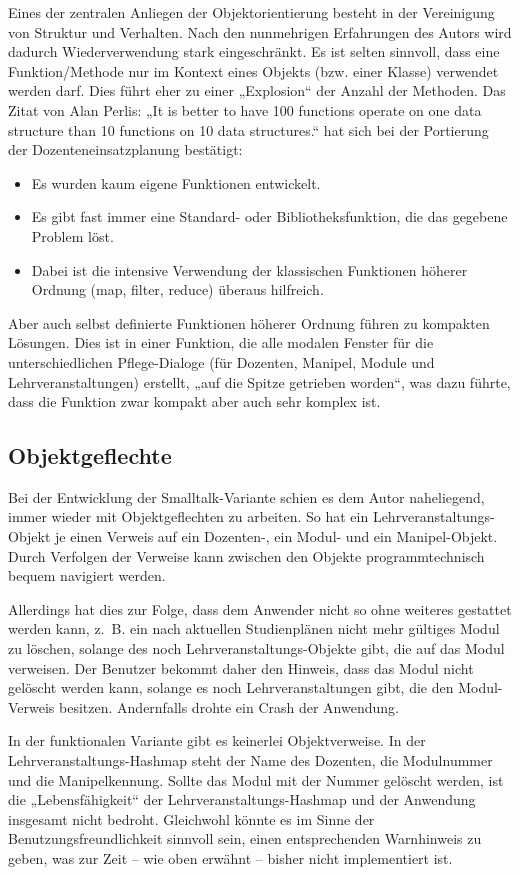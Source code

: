 \documentclass[11pt]{article}
\begin{document}
Eines der zentralen Anliegen der Objektorientierung besteht in der
Vereinigung von Struktur und Verhalten. Nach den nunmehrigen
Erfahrungen des Autors wird dadurch Wiederverwendung stark
eingeschränkt. Es ist selten sinnvoll, dass eine Funktion/Methode nur
im Kontext eines Objekts (bzw. einer Klasse) verwendet werden
darf. Dies führt eher zu einer „Explosion“ der Anzahl der
Methoden. Das Zitat von Alan Perlis: „It is better to have 100
functions operate on one data structure than 10 functions on 10 data
structures.“ hat sich bei der Portierung der Dozenteneinsatzplanung bestätigt:
\begin{itemize}
\item Es wurden kaum eigene Funktionen entwickelt.
\item Es gibt fast immer eine Standard- oder Bibliotheksfunktion, die das
gegebene Problem löst.
\item Dabei ist die intensive Verwendung der klassischen Funktionen
höherer Ordnung (map, filter, reduce) überaus hilfreich.
\end{itemize}
Aber auch selbst definierte Funktionen höherer Ordnung führen zu kompakten
Lösungen. Dies ist in einer Funktion, die alle modalen Fenster für die
unterschiedlichen Pflege-Dialoge (für Dozenten, Manipel, Module und
Lehrveranstaltungen) erstellt, „auf die Spitze getrieben worden“, was
dazu führte, dass die Funktion zwar kompakt aber auch sehr komplex
ist.
\subsection*{Objektgeflechte}
\label{sec:org009efe7}
Bei der Entwicklung der Smalltalk-Variante schien es dem Autor
naheliegend, immer wieder mit Objektgeflechten zu arbeiten. So hat ein
Lehrveranstaltungs-Objekt je einen Verweis auf ein Dozenten-, ein
Modul- und ein Manipel-Objekt. Durch Verfolgen der Verweise kann
zwischen den Objekte programmtechnisch bequem navigiert werden.

Allerdings hat dies zur Folge, dass dem Anwender nicht so ohne
weiteres gestattet werden kann, z.~B. ein nach aktuellen
Studienplänen nicht mehr gültiges Modul zu löschen, solange des noch
Lehrveranstaltungs-Objekte gibt, die auf das Modul verweisen. Der
Benutzer bekommt daher den Hinweis, dass das Modul nicht gelöscht werden
kann, solange es noch Lehrveranstaltungen gibt, die den Modul-Verweis
besitzen. Andernfalls drohte ein Crash der Anwendung.

In der funktionalen Variante gibt es keinerlei Objektverweise. In der
Lehrveranstaltungs-Hashmap steht der Name des Dozenten, die
Modulnummer und die Manipelkennung. Sollte das Modul mit der Nummer
gelöscht werden, ist die „Lebensfähigkeit“ der
Lehrveranstaltungs-Hashmap und der Anwendung insgesamt nicht
bedroht. Gleichwohl könnte es im Sinne der Benutzungsfreundlichkeit
sinnvoll sein, einen entsprechenden Warnhinweis zu geben, was zur
Zeit -- wie oben erwähnt -- bisher nicht implementiert ist.
\end{document}
